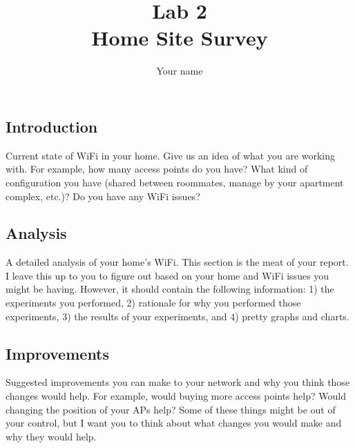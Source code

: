 \documentclass[letterpaper,twocolumn,10pt]{article}
\title{Lab 2\\
Home Site Survey}
\author{Your name}
\begin{document}
\maketitle

\subsection*{Introduction}

Current state of WiFi in your home. Give us an idea of what you are working with. For example, how many access points do you have? What kind of configuration you have (shared between roommates, manage by your apartment complex, etc.)? Do you have any WiFi issues?

\subsection*{Analysis}

A detailed analysis of your home’s WiFi. This section is the meat of your report. I leave this up to you to figure out based on your home and WiFi issues you might be having. However, it should contain the following information: 1) the experiments you performed, 2) rationale for why you performed those experiments, 3) the results of your experiments, and 4) pretty graphs and charts.

\subsection*{Improvements}

Suggested improvements you can make to your network and why you think those changes would help. For example, would buying more access points help? Would changing the position of your APs help? Some of these things might be out of your control, but I want you to think about what changes you would make and why they would help.
\end{document}

